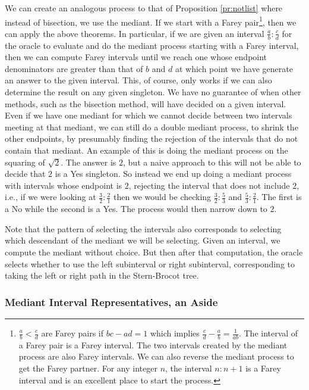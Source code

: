 \documentclass[12pt]{article}
\begin{document}
We can create an analogous process to that of Proposition \ref{pr:notlist} where instead of bisection, we use the mediant. If we start with a Farey pair\footnote{$\frac{a}{b} < \frac{c}{d}$ are Farey pairs if $bc-ad=1$ which implies $\frac{c}{d} - \frac{a}{b} = \frac{1}{ab}$. The interval of a Farey pair is a Farey interval. The two intervals created by the mediant process are also Farey intervals. We can also reverse the mediant process to get the Farey partner. For any integer $n$, the interval $n:n+1$ is a Farey interval and is an excellent place to start the process.}, then we can apply the above theorems. In particular, if we are given an interval $\frac{a}{b} : \frac{c}{d}$ for the oracle to evaluate and do the mediant process starting with a Farey interval, then we can compute Farey intervals until we reach one whose endpoint denominators are greater than that of $b$ and $d$ at which point we have generate an answer to the given interval. This, of course, only works if we can also determine the result on any given singleton. We have no guarantee of when other methods, such as the bisection method, will have decided on a given interval. Even if we have one mediant for which we cannot decide between two intervals meeting at that mediant, we can still do a double mediant process, to shrink the other endpoints, by presumably finding the rejection of the intervals that do not contain that mediant. An example of this is doing the mediant process on the squaring of $\sqrt{2}$. The answer is $2$, but a naive approach to this will not be able to decide that $2$ is a Yes singleton. So instead we end up doing a mediant process with intervals whose endpoint is $2$, rejecting the interval that does not include $2$, i.e.,  if we were looking at $\frac{3}{2}:\frac{2}{1}$ then we would be checking $\frac{3}{2}:\frac{5}{3}$ and $\frac{5}{3}:\frac{2}{1}$. The first is a No while the second is a Yes. The process would then narrow down to $2$. 

Note that the pattern of selecting the intervals also corresponds to selecting which descendant of the mediant we will be selecting. Given an interval, we compute the mediant without choice. But then after that computation, the oracle selects whether to use the left subinterval or right subinterval, corresponding to taking the left or right path in the Stern-Brocot tree.

\subsubsection{Mediant Interval Representatives, an Aside}
\end{document}
